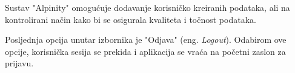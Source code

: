 Sustav "Alpinity" omogućuje dodavanje korisničko kreiranih podataka, ali na kontrolirani način kako bi se osigurala kvaliteta i točnost podataka. 

Posljednja opcija unutar izbornika je "Odjava" (eng. \textit{Logout}). Odabirom ove opcije, korisnička sesija se prekida i aplikacija se vraća na početni zaslon za prijavu.
